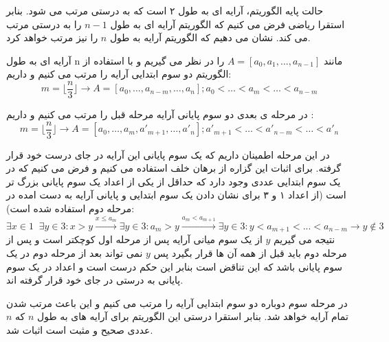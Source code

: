 \documentclass[]{article}
\begin{document}
حالت پایه الگوریتم، آرایه ای به طول ۲ است که به درستی مرتب می شود. بنابر استقرا ریاضی
فرض می کنیم که الگوریتم آرایه ای به طول $n - 1$ را به درستی مرتب می کند.
نشان می دهیم که الگوریتم آرایه به طول $n$ را نیز مرتب خواهد کرد.

آرایه ای به طول n مانند $A = [a_0, a_1, \ldots, a_{n-1}]$
را در نظر می گیریم و با استفاده از الگوریتم دو سوم ابتدایی آرایه را مرتب می کنیم و داریم:
$$
m = \lfloor \frac{n}{3} \rfloor \rightarrow A = [a_0, \ldots, a_{n-m}, \ldots, a_n] ; a_0 < \ldots < a_m < \ldots < a_{n-m}
$$

در مرحله ی بعدی دو سوم پایانی آرایه مرحله قبل را مرتب می کنیم و داریم :
$$
m = \lfloor \frac{n}{3} \rfloor \rightarrow A = [a_0, \ldots, a_{m}, a'_{m+1}, \ldots, a'_n] ; a'_{m+1} < \ldots < a'_{n-m} < \ldots < a'_n
$$

در این مرحله اطمینان داریم که یک سوم پایانی این آرایه در جای درست خود قرار گرفته.
برای اثبات این گزاره از برهان خلف استفاده می کنیم و فرض می کنیم که در یک سوم ابتدایی عددی وجود دارد که
حداقل از یکی از اعداد یک سوم پایانی بزرگ تر است
(از اعداد ۱ و ۳ برای نشان دادن یک سوم ابتدایی و پایانی آرایه به دست امده در مرحله دوم استفاده شده است):
$$
\exists x \in 1 \; \; \exists y \in 3 : x > y \xrightarrow{x \le a_m} \exists y \in 3: a_m > y
\xrightarrow{a_m < a_{m+1}} \exists y \in 3 : y < a_{m+1} < ... < a_{n-m} \rightarrow y \not \in 3
$$
نتیجه می گیریم $y$ از یک سوم میانی آرایه پس از مرحله اول کوچکتر است
و پس از مرحله دوم باید قبل از همه آن ها قرار بگیرد پس $y$ نمی تواند بعد از مرحله دوم
در یک سوم پایانی باشد
که این تناقض است بنابر این حکم درست است و اعداد در یک سوم پایانی به درستی در جای خود قرار گرفته اند.

در مرحله سوم دوباره دو سوم ابتدایی آرایه را مرتب می کنیم و این باعث مرتب شدن تمام آرایه خواهد شد. بنابر استقرا
درستی این الگوریتم برای آرایه های به طول $n$ که $n$
عددی صحیح و مثبت است اثبات شد.
\end{document}
